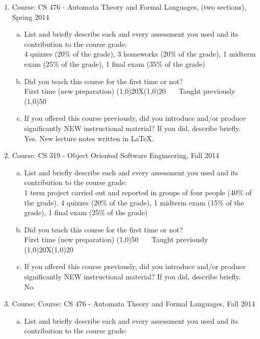 \begin{enumerate}
  \item Course: CS 476 - Automata Theory and Formal Languages, (two sections), Spring 2014
    \begin{enumerate}[a)]
    \item  List and briefly describe each and every assessment you used and its contribution to the course grade:\\
      4 quizzes (20\% of the grade),  3 homeworks (20\% of the grade), 1 midterm exam (25\% of the grade), 1 final exam (35\% of the grade) 	 
    \item Did you teach this course for the first time or not? \\
      First time (new preparation) \line(1,0){20}X\line(1,0){20}  ~~~Taught previously \line(1,0){50}
    \item If you offered this course previously, did you introduce and/or produce significantly NEW instructional material? If you did, describe briefly. \\
      Yes. New lecture notes written in \LaTeX.
    \end{enumerate}
  \item Course: CS 319 - Object Oriented Software Engineering, Fall 2014
    \begin{enumerate}[a)]
    \item  List and briefly describe each and every assessment you used and its contribution to the course grade:\\
      1 term project carried out and reported in groups of four people (40\% of the grade).  4 quizzes (20\% of the grade), 1 midterm exam (15\% of the grade), 1 final exam (25\% of the grade) 
    \item Did you teach this course for the first time or not? \\
      First time (new preparation) \line(1,0){50}  ~~~Taught previously \line(1,0){20}X\line(1,0){20}
    \item If you offered this course previously, did you introduce and/or produce significantly NEW instructional material? If you did, describe briefly. \\
      No.
    \end{enumerate}
  \item Course: Course: CS 476 - Automata Theory and Formal Languages, Fall 2014
    \begin{enumerate}[a)]
    \item  List and briefly describe each and every assessment you used and its contribution to the course grade:\\

\end{enumerate}
\end{enumerate}
